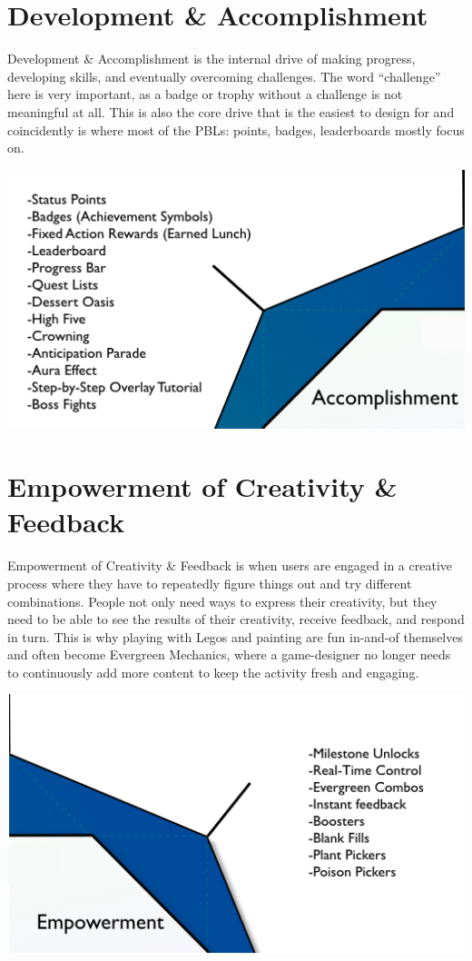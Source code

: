 \documentclass[
]{book}
\begin{document}
\hypertarget{development-accomplishment}{%
\section{Development \& Accomplishment}\label{development-accomplishment}}

Development \& Accomplishment is the internal drive of making progress, developing skills, and eventually overcoming challenges. The word ``challenge'' here is very important, as a badge or trophy without a challenge is not meaningful at all. This is also the core drive that is the easiest to design for and coincidently is where most of the PBLs: points, badges, leaderboards mostly focus on.

\begin{center}\includegraphics[width=0.75\linewidth]{assets/images/core-drive-2-development-and-accomplishment} \end{center}

\hypertarget{empowerment-of-creativity-feedback}{%
\section{Empowerment of Creativity \& Feedback}\label{empowerment-of-creativity-feedback}}

Empowerment of Creativity \& Feedback is when users are engaged in a creative process where they have to repeatedly figure things out and try different combinations. People not only need ways to express their creativity, but they need to be able to see the results of their creativity, receive feedback, and respond in turn. This is why playing with Legos and painting are fun in-and-of themselves and often become Evergreen Mechanics, where a game-designer no longer needs to continuously add more content to keep the activity fresh and engaging.

\begin{center}\includegraphics[width=0.75\linewidth]{assets/images/core-drive-3-empowerment-of-creativith-and-feedback} \end{center}
\end{document}
